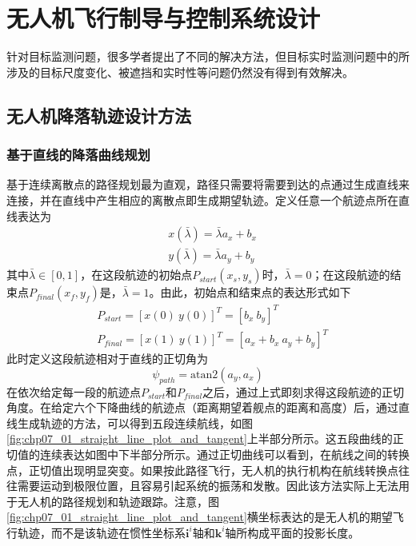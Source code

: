 \chapter{无人机飞行制导与控制系统设计}
针对目标监测问题，很多学者提出了不同的解决方法，但目标实时监测问题中的所涉及的目标尺度变化、被遮挡和实时性等问题仍然没有得到有效解决。
 
\section{无人机降落轨迹设计方法}

\subsection{基于直线的降落曲线规划}
基于连续离散点的路径规划最为直观，路径只需要将需要到达的点通过生成直线来连接，并在直线中产生相应的离散点即生成期望轨迹。定义任意一个航迹点所在直线表达为
\begin{align}
&x(\bar{\lambda}) =\bar{\lambda} a_x + b_x \\
&y(\bar{\lambda}) =  \bar{\lambda} a_y +b_y
\end{align}
其中$\bar{\lambda} \in [0, 1]$，在这段航迹的初始点$P_{start}(x_s, y_s)$时，$\bar{\lambda} = 0$；在这段航迹的结束点$P_{final}(x_f,y_f)$是，$\bar{\lambda} = 1$。由此，初始点和结束点的表达形式如下
\begin{align}
&P_{start} = [x(0)\ y(0)]^T=[b_x\ b_y]^T \\
&P_{final} = [x(1)\ y(1)]^T=[a_x+b_x\ a_y+b_y]^T
\end{align}
此时定义这段航迹相对于直线的正切角为
\begin{equation}
\psi_{path}=\text{atan2}(a_y, a_x)
\end{equation}
在依次给定每一段的航迹点$P_{start}$和$P_{final}$之后，通过上式即刻求得这段航迹的正切角度。在给定六个下降曲线的航迹点（距离期望着舰点的距离和高度）后，通过直线生成轨迹的方法，可以得到五段连续航线，如图\ref{fig:chp07_01_straight_line_plot_and_tangent}上半部分所示。这五段曲线的正切值的连续表达如图中下半部分所示。通过正切曲线可以看到，在航线之间的转换点，正切值出现明显突变。如果按此路径飞行，无人机的执行机构在航线转换点往往需要运动到极限位置，且容易引起系统的振荡和发散。因此该方法实际上无法用于无人机的路径规划和轨迹跟踪。注意，图\ref{fig:chp07_01_straight_line_plot_and_tangent}横坐标表达的是无人机的期望飞行轨迹，而不是该轨迹在惯性坐标系$\mathbf{i}^{i}$轴和$\mathbf{k}^{i}$轴所构成平面的投影长度。

